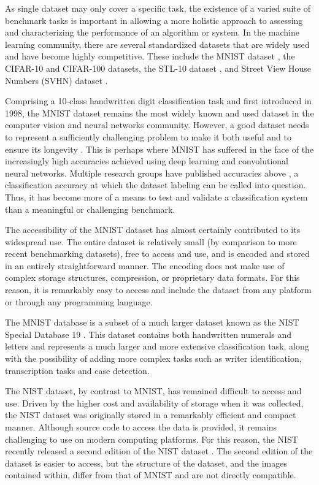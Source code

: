 \documentclass[conference]{IEEEtran}
\begin{document}
As single dataset may only cover a specific task, the existence of a varied suite of benchmark tasks is important in allowing a more holistic approach to assessing and characterizing the performance of an algorithm or system. In the machine learning community, there are several standardized datasets that are widely used and have become highly competitive. These include the MNIST dataset \cite{LeCun1998}, the CIFAR-10 and CIFAR-100 \cite{Krizhevsky2009} datasets,  the STL-10 dataset \cite{Coates2011}, and Street View House Numbers (SVHN) dataset \cite{Netzer2011}.

Comprising a 10-class handwritten digit classification task and first introduced in 1998, the MNIST dataset remains the most widely known and used dataset in the computer vision and neural networks community. However, a good dataset needs to represent a sufficiently challenging problem to make it both useful and to ensure its longevity \cite{Orchard2015b}. This is perhaps where MNIST has suffered in the face of the increasingly high accuracies achieved using deep learning and convolutional neural networks. Multiple research groups have published accuracies above  \cite{Wan2013, Ciresan2012a, Sato2015, Chang2015, Lee2015a}, a classification accuracy at which the dataset labeling can be called into question. Thus, it has become more of a means to test and validate a classification system than a meaningful or challenging benchmark. 

The accessibility of the MNIST dataset has almost certainly contributed to its widespread use. The entire dataset is relatively small (by comparison to more recent benchmarking datasets), free to access and use, and is encoded and stored in an entirely straightforward manner. The encoding does not make use of complex storage structures, compression, or proprietary data formats. For this reason, it is remarkably easy to access and include the dataset from any platform or through any programming language. 

The MNIST database is a subset of a much larger dataset known as the NIST Special Database 19 \cite{Grother1995}. This dataset contains both handwritten numerals and letters and represents a much larger and more extensive classification task, along with the possibility of adding more complex tasks such as writer identification, transcription tasks and case detection.

The NIST dataset, by contrast to MNIST, has remained difficult to access and use. Driven by the higher cost and availability of storage when it was collected, the NIST dataset was originally stored in a remarkably efficient and compact manner. Although source code to access the data is provided, it remains challenging to use on modern computing platforms. For this reason, the NIST recently released a second edition of the NIST dataset \cite{Grother2016}. The second edition of the dataset is easier to access, but the structure of the dataset, and the images contained within, differ from that of MNIST and are not directly compatible.
\end{document}

